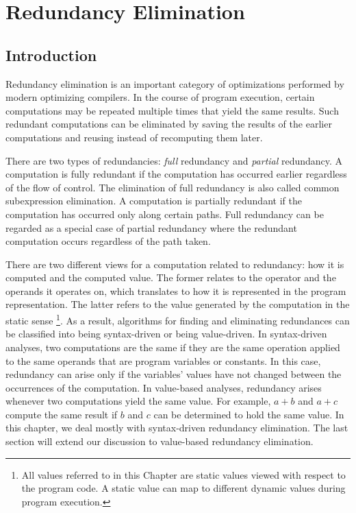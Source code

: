 \chapter{Redundancy Elimination }
\label{chapter:pre_not_helped}
\graphicspath{{img/}{pre_not_helped/img/}{part3/pre_not_helped/img/}}

\section{Introduction}
\label{section:Part3:Pre_not_helped:Intro}

Redundancy elimination is an 
important category of optimizations performed by modern optimizing compilers.
In the course of program execution, certain computations may be repeated
multiple times that yield the same results.  Such redundant
computations can be eliminated by saving the results of the earlier
computations and reusing instead of recomputing them later.

There are two types of redundancies: \emph{full} redundancy and 
\emph{partial} redundancy.  A computation is fully redundant if the 
computation has occurred earlier regardless of the flow of control.
The elimination of full redundancy is also called common subexpression
elimination.  A computation is partially redundant if the 
computation has occurred only along certain paths.  Full redundancy can be
regarded as a special case of partial redundancy where the redundant computation
occurs regardless of the path taken.

There are two different views for a computation related to redundancy: how it 
is computed and the computed value.  The former relates to the operator
and the operands it operates on, which translates to how it is 
represented in the program representation.  The latter refers to the value
generated by the computation in the static sense
\footnote{All values referred to in this Chapter are static values viewed
with respect to the program code.  A static value can map to different
dynamic values during program execution.}.  As a result, algorithms for
finding and eliminating redundances can be classified into being syntax-driven
or being value-driven.  In syntax-driven analyses,
two computations are the same if they are the same operation applied to the
same operands that are program variables or constants.
In this case, redundancy can arise only if the 
variables' values have not changed between the occurrences of the computation.
In value-based analyses, redundancy arises whenever two computations yield the
same value.  For example, $a+b$ and $a+c$ compute the same result
if $b$ and $c$ can be determined to hold the same value.
In this chapter, we deal mostly with syntax-driven redundancy elimination.
The last section will extend our discussion to value-based redundancy
elimination.

